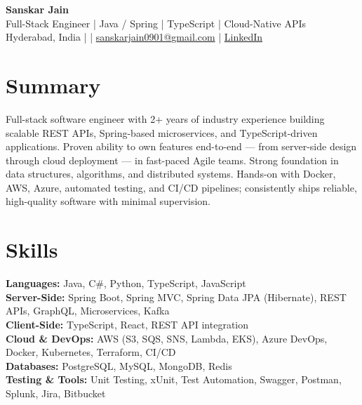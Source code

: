 \documentclass[10pt,letterpaper]{article}
\begin{document}
\begin{center}
    {\Large \textbf{Sanskar Jain}} \\
    Full-Stack Engineer \;|\; Java / Spring \;|\; TypeScript \;|\; Cloud-Native APIs \\
    Hyderabad, India \enspace |  \enspace | \enspace
    \href{mailto:sanskarjain0901@gmail.com}{sanskarjain0901@gmail.com} \enspace | \enspace
    \href{https://www.linkedin.com/in/sanskar-jain0901/}{LinkedIn}
\end{center}

\vspace{2pt}

\section*{Summary}
Full-stack software engineer with 2+ years of industry experience building scalable REST APIs, Spring-based microservices, and TypeScript-driven applications. Proven ability to own features end-to-end --- from server-side design through cloud deployment --- in fast-paced Agile teams. Strong foundation in data structures, algorithms, and distributed systems. Hands-on with Docker, AWS, Azure, automated testing, and CI/CD pipelines; consistently ships reliable, high-quality software with minimal supervision.

\section*{Skills}
\textbf{Languages:} Java, C\#, Python, TypeScript, JavaScript \\
\textbf{Server-Side:} Spring Boot, Spring MVC, Spring Data JPA (Hibernate), REST APIs, GraphQL, Microservices, Kafka \\
\textbf{Client-Side:} TypeScript, React, REST API integration \\
\textbf{Cloud \& DevOps:} AWS (S3, SQS, SNS, Lambda, EKS), Azure DevOps, Docker, Kubernetes, Terraform, CI/CD \\
\textbf{Databases:} PostgreSQL, MySQL, MongoDB, Redis \\
\textbf{Testing \& Tools:} Unit Testing, xUnit, Test Automation, Swagger, Postman, Splunk, Jira, Bitbucket
\end{document}

